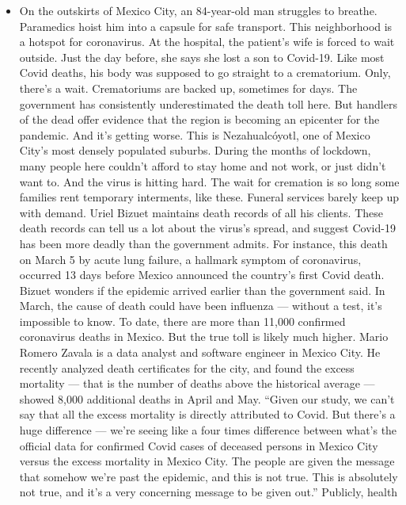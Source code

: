 \begin{itemize}
\tightlist
\item
  On the outskirts of Mexico City, an 84-year-old man struggles to
  breathe. Paramedics hoist him into a capsule for safe transport. This
  neighborhood is a hotspot for coronavirus. At the hospital, the
  patient's wife is forced to wait outside. Just the day before, she
  says she lost a son to Covid-19. Like most Covid deaths, his body was
  supposed to go straight to a crematorium. Only, there's a wait.
  Crematoriums are backed up, sometimes for days. The government has
  consistently underestimated the death toll here. But handlers of the
  dead offer evidence that the region is becoming an epicenter for the
  pandemic. And it's getting worse. This is Nezahualcóyotl, one of
  Mexico City's most densely populated suburbs. During the months of
  lockdown, many people here couldn't afford to stay home and not work,
  or just didn't want to. And the virus is hitting hard. The wait for
  cremation is so long some families rent temporary interments, like
  these. Funeral services barely keep up with demand. Uriel Bizuet
  maintains death records of all his clients. These death records can
  tell us a lot about the virus's spread, and suggest Covid-19 has been
  more deadly than the government admits. For instance, this death on
  March 5 by acute lung failure, a hallmark symptom of coronavirus,
  occurred 13 days before Mexico announced the country's first Covid
  death. Bizuet wonders if the epidemic arrived earlier than the
  government said. In March, the cause of death could have been
  influenza --- without a test, it's impossible to know. To date, there
  are more than 11,000 confirmed coronavirus deaths in Mexico. But the
  true toll is likely much higher. Mario Romero Zavala is a data analyst
  and software engineer in Mexico City. He recently analyzed death
  certificates for the city, and found the excess mortality --- that is
  the number of deaths above the historical average --- showed 8,000
  additional deaths in April and May. ``Given our study, we can't say
  that all the excess mortality is directly attributed to Covid. But
  there's a huge difference --- we're seeing like a four times
  difference between what's the official data for confirmed Covid cases
  of deceased persons in Mexico City versus the excess mortality in
  Mexico City. The people are given the message that somehow we're past
  the epidemic, and this is not true. This is absolutely not true, and
  it's a very concerning message to be given out.'' Publicly, health

\end{itemize}
